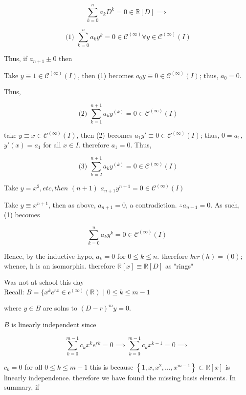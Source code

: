 \documentclass{article}
\theoremstyle{definition}
\begin{document}
\[   \sum_{k=0}^n a_kD^k = 0 \in \mathbb{R}[D] \implies \]

\[ \text{ (1) }  \sum_{k=0}^n a_ky^k = 0 \in \mathscr{C}^{(\infty)} \forall y \in
\mathscr{C}^{(\infty)}(I) \]

Thus, if \( a_{n+1} \pm 0 \) then 

Take \( y \equiv 1 \in \mathscr{C}^{(\infty)}(I)\), then (1)
becomes \( a_0y \equiv 0 \in \mathscr{C}^{(\infty)}(I) \); thus, \( a_0
= 0\). 

Thus, 

\[ \text{ (2) } \sum_{k=1}^{n+1} a_ky^{(k)} =0 \in \mathscr{C}^{(\infty)}(I) \]

take \( y \equiv x \in \mathscr{C}^{(\infty)}(I) \), then (2) becomes \(
a_1y' \equiv 0 \in \mathscr{C}^{(\infty)}(I)\); thus, \( 0 = a_1\), \(y'(x) =
a_1\) for all \( x \in I \). therefore \( a_1 = 0 \). Thus, 

\[ \text{ (3) } \sum_{k=2}^{n+1}a_ky^{(k)} = 0 \in \mathscr{C}^{(\infty)}(I)\]

Take \( y = x^2, etc, then  \) \( (n+1) \) \( a_{n+1}y^{n+1} = 0 \in \mathscr{C}^{(\infty)}(I) \)

Take \( y \equiv x^{n+1} \), then as above, \( a_{n+1} = 0 \), a
contradiction. \( \therefore a_{n+1} =0\). As such, (1) becomes 

\[ \sum_{k=0}^n a_ky^k = 0 \in \mathscr{C}^{(\infty)}(I) \]

Hence, by the inductive hypo, \( a_k =0 \) for \( 0 \leq k \leq n \).
therefore \( ker(h) = (0) \); whence, h is an isomorphis. therefore \(
\mathbb{R}[x] \equiv \mathbb{R}[D]  \) as "rings"

Was not at school this day\\ 

Recall: \( B = \{ x^k e^{rx} \in \mathscr{c}^{(\infty)} ( \mathbb{R})
\text{ | } 0 \leq k \leq m-1\)

where \( y \in B \) are solns to \( (D-r)^my=0 \). 

\( B \) is linearly independent since 

\[ \sum_{k=0}^{m-1} c_k x^k e^{rk} = 0 \implies \sum_{k=0}^{m-1}
c_kx^{k-1} = 0 \implies\]

\( c_k = 0  \) for all \( 0 \leq k \leq m-1 \) this is because \(
\left\{ 1, x, x^2, \dots , x^{m-1} \right\} \subset \mathbb{R}[x]\)
is linearly independence. therefore we have found the missing basis
elements. In summary, if 
\end{document}
